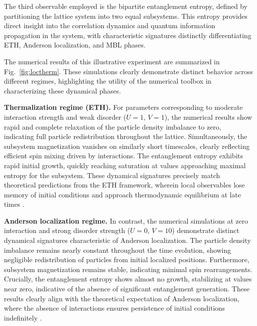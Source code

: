 The third observable employed is the bipartite entanglement entropy, defined by partitioning the lattice system into two equal subsystems. This entropy provides direct insight into the correlation dynamics and quantum information propagation in the system, with characteristic signatures distinctly differentiating ETH, Anderson localization, and MBL phases.

The numerical results of this illustrative experiment are summarized in Fig.~\ref{fig:loctherm}. These simulations clearly demonstrate distinct behavior across different regimes, highlighting the utility of the numerical toolbox in characterizing these dynamical phases.


\textbf{Thermalization regime (ETH).}
For parameters corresponding to moderate interaction strength and weak disorder ($U=1$, $V=1$), the numerical results show rapid and complete relaxation of the particle density imbalance to zero, indicating full particle redistribution throughout the lattice. Simultaneously, the subsystem magnetization vanishes on similarly short timescales, clearly reflecting efficient spin mixing driven by interactions. The entanglement entropy exhibits rapid initial growth, quickly reaching saturation at values approaching maximal entropy for the subsystem. These dynamical signatures precisely match theoretical predictions from the ETH framework, wherein local observables lose memory of initial conditions and approach thermodynamic equilibrium at late times \cite{deutsch_quantum_1991,srednicki_chaos_1994}.

\textbf{Anderson localization regime.}
In contrast, the numerical simulations at zero interaction and strong disorder strength ($U=0$, $V=10$) demonstrate distinct dynamical signatures characteristic of Anderson localization. The particle density imbalance remains nearly constant throughout the time evolution, showing negligible redistribution of particles from initial localized positions. Furthermore, subsystem magnetization remains stable, indicating minimal spin rearrangements. Crucially, the entanglement entropy shows almost no growth, stabilizing at values near zero, indicative of the absence of significant entanglement generation. These results clearly align with the theoretical expectation of Anderson localization, where the absence of interactions ensures persistence of initial conditions indefinitely \cite{anderson_absence_1958,abrahams_50_2010}.

